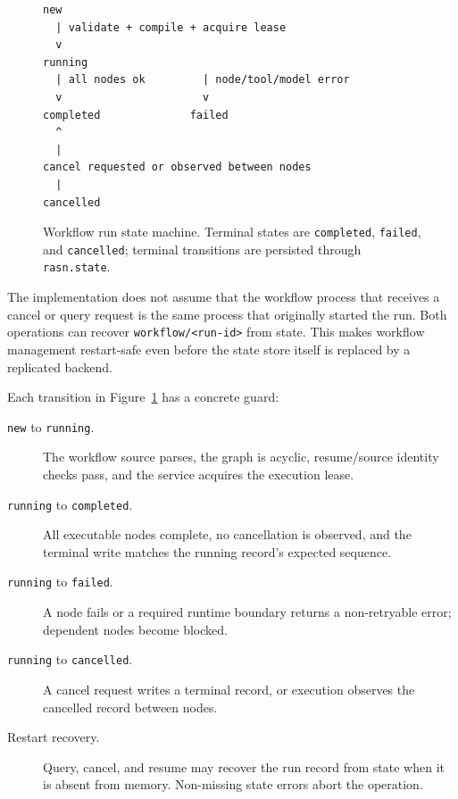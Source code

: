 \documentclass[manuscript,screen,review]{acmart}
\begin{document}
\begin{figure}[t]
\centering
\begin{lstlisting}
new
  | validate + compile + acquire lease
  v
running
  | all nodes ok         | node/tool/model error
  v                      v
completed              failed
  ^
  |
cancel requested or observed between nodes
  |
cancelled
\end{lstlisting}
\caption{Workflow run state machine. Terminal states are \texttt{completed},
\texttt{failed}, and \texttt{cancelled}; terminal transitions are persisted
through \texttt{rasn.state}.}
\label{fig:workflow-state-machine}
\end{figure}

The implementation does not assume that the workflow process that receives a
cancel or query request is the same process that originally started the run.
Both operations can recover \texttt{workflow/<run-id>} from state. This makes
workflow management restart-safe even before the state store itself is replaced
by a replicated backend.

Each transition in Figure~\ref{fig:workflow-state-machine} has a concrete
guard:

\begin{description}
  \item[\texttt{new} to \texttt{running}.] The workflow source parses, the graph
  is acyclic, resume/source identity checks pass, and the service acquires the
  execution lease.
  \item[\texttt{running} to \texttt{completed}.] All executable nodes complete,
  no cancellation is observed, and the terminal write matches the running
  record's expected sequence.
  \item[\texttt{running} to \texttt{failed}.] A node fails or a required runtime
  boundary returns a non-retryable error; dependent nodes become blocked.
  \item[\texttt{running} to \texttt{cancelled}.] A cancel request writes a
  terminal record, or execution observes the cancelled record between nodes.
  \item[Restart recovery.] Query, cancel, and resume may recover the run record
  from state when it is absent from memory. Non-missing state errors abort the
  operation.
\end{description}
\end{document}
